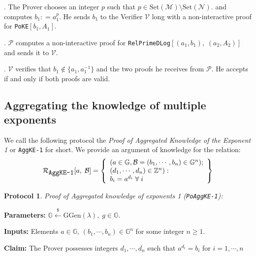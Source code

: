 \documentclass[11pt, lettersize, notitlepage, leqno, footskip=0.6cm]{article}
\newcommand{\bz}{\mathbb Z}
\newcommand{\sett}{\mr{Set}}
\newcommand{\mc}{\mathcal}
\newcommand{\mb}{\mathbb}
\newcommand{\mr}{\mathrm}
\newcommand{\lamb}{\lambda}
\newcommand{\mP}{\mc{P}}
\newcommand{\V}{\mc{V}}
\newcommand{\noin}{\noindent}
\newtheorem{Prot}[Thm]{Protocol}
\numberwithin{equation}{section}
\begin{document}
\noin 1. The Prover chooses an integer $p$ such that $p\in \sett(\mc{M})\setminus \sett(\mc{N}).$ and computes $b_1: = a_1^p$. He sends $b_1$ to the Verifier $\V$ long with a non-interactive proof for \verb|PoKE|$[b_1, A_1]$.

\noin 2. $\mP$ computes a non-interactive proof for \verb|RelPrimeDLog|$[(a_1, b_1),\; (a_2, A_2)]$ and sends it to $\V$.

\noin 3. $\V$ verifies that $b_1\notin \{ a_1, a_1^{-1}\}$ and the two proofs he receives from $\mP$. He accepts if and only if both proofs are valid.


\bigskip



\subsection{\fontsize{11}{11}\selectfont Aggregating the knowledge of multiple exponents}

We call the following protocol the \textit{Proof of Aggregated Knowledge of the Exponent 1} or \verb|AggKE-1| for short. We provide an argument of knowledge for the relation:
\[
  \mc{R}_{{\protect\verb|AggKE-1|}}[a,\; \mc{B}] = \left\{\begin{array}{l}
    (a\in\mb{G}, \mc{B} = (b_1,\cdots, b_n)\in\mb{G}^n);\\ 
    (d_1,\cdots,d_n)\in\bz^n):  \\
    b_i = a^{d_i}\;\forall\; i
  \end{array}\right\}
\]


\vspace{0.1cm}

\begin{Prot} \normalfont \textit{Proof of Aggregated knowledge of exponents} 1 (\verb|PoAggKE-1|):\end{Prot} \vspace{-0.3cm}

\noindent \textbf{Parameters:} $\mb{G}\xleftarrow{\$} \mr{GGen}(\lamb), \; g\in \mb{G}$.

\noindent \textbf{Inputs:} Elements $a\in\mb{G} $, $(b_1,\cdots,b_n)\in \mb{G}^n$ for some integer $n\geq 1$.

\noindent \textbf{Claim:} The Prover possesses integers $d_1,\cdots, d_n$ such that $a^{d_i} = b_i$ for $i = 1,\cdots, n$
\end{document}
